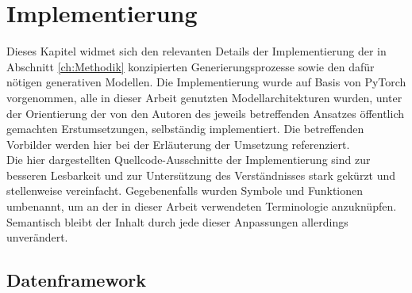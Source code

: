 \chapter{Implementierung}
\label{ch:Implementierung}

Dieses Kapitel widmet sich den relevanten Details der Implementierung der in Abschnitt \ref{ch:Methodik} konzipierten Generierungsprozesse sowie den dafür nötigen generativen Modellen. Die Implementierung wurde auf Basis von PyTorch vorgenommen, alle in dieser Arbeit genutzten Modellarchitekturen wurden, unter der Orientierung der von den Autoren des jeweils betreffenden Ansatzes öffentlich gemachten Erstumsetzungen, selbständig implementiert. Die betreffenden Vorbilder werden hier bei der Erläuterung der Umsetzung referenziert. \\
Die hier dargestellten Quellcode-Ausschnitte der Implementierung sind zur besseren Lesbarkeit und zur Untersützung des Verständnisses stark gekürzt und stellenweise vereinfacht. Gegebenenfalls wurden Symbole und Funktionen umbenannt, um an der in dieser Arbeit verwendeten Terminologie anzuknüpfen. Semantisch bleibt der Inhalt durch jede dieser Anpassungen allerdings unverändert.





\section {Datenframework}


